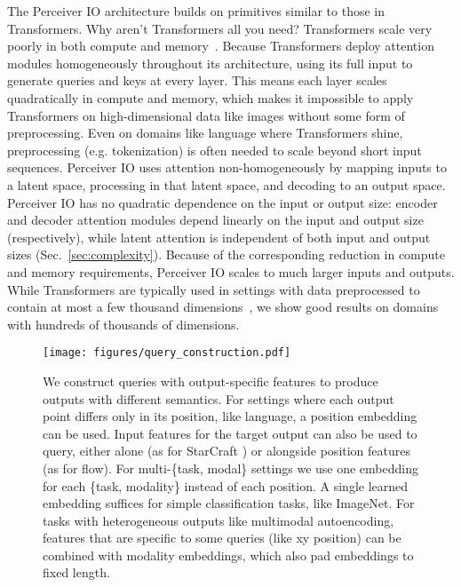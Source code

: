 \documentclass{article} \usepackage{iclr2022_conference,times}
\newcommand{\ourmodel}{Perceiver IO\xspace}
\begin{document}
The \ourmodel{} architecture builds on primitives similar to those in Transformers. Why aren't Transformers all you need? Transformers scale very poorly in both compute and memory~\citep{tay2020efficient}. Because Transformers deploy attention modules homogeneously throughout its architecture, using its full input to generate queries and keys at every layer. This means each layer scales quadratically in compute and memory, which makes it impossible to apply Transformers on high-dimensional data like images without some form of preprocessing. Even on domains like language where Transformers shine, preprocessing (e.g. tokenization) is often needed to scale beyond short input sequences. \ourmodel{} uses attention non-homogeneously by mapping inputs to a latent space, processing in that latent space, and decoding to an output space. \ourmodel{} has no quadratic dependence on the input or output size: encoder and decoder attention modules depend linearly on the input and output size (respectively), while latent attention is independent of both input and output sizes (Sec.~\ref{sec:complexity}). Because of the corresponding reduction in compute and memory requirements, \ourmodel{} scales to much larger inputs and outputs. While Transformers are typically used in settings with data preprocessed to contain at most a few thousand dimensions~\citep{brown2020language, raffell2020exploring}, we show good results on domains with hundreds of thousands of dimensions.

\begin{figure*}[t]
    \centering
    \texttt{[image: figures/query\_construction.pdf]}
    \vspace{-5pt}
    \caption{We construct queries with output-specific features to produce outputs with different semantics. For settings where each output point differs only in its position, like language, a position embedding can be used. Input features for the target output can also be used to query, either alone (as for StarCraft ) or alongside position features (as for flow). For multi-\{task, modal\} settings we use one embedding for each \{task, modality\} instead of each position. A single learned embedding suffices for simple classification tasks, like ImageNet. For tasks with heterogeneous outputs like multimodal autoencoding, features that are specific to some queries (like xy position) can be combined with modality embeddings, which also pad embeddings to fixed length.}
    \label{fig:queries}
    \vspace{-15pt}
\end{figure*}
\end{document}
